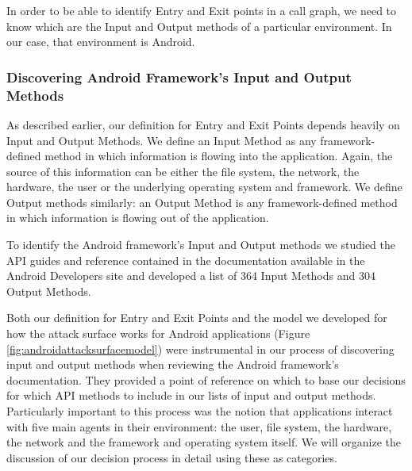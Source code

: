 \documentclass{sig-alternate}
\begin{document}
In order to be able to identify Entry and Exit points in a call graph, we need to know which are the Input and Output methods of a particular environment. In our case, that environment is Android.

\subsubsection{Discovering Android Framework's Input and Output Methods}

As described earlier, our definition for Entry and Exit Points depends heavily on Input and Output Methods. We define an Input Method as any framework-defined method in which information is flowing into the application. Again, the source of this information can be either the file system, the network, the hardware, the user or the underlying operating system and framework. We define Output methods similarly: an Output Method is any framework-defined method in which information is flowing out of the application.

To identify the Android framework’s Input and Output methods we studied the API guides and reference contained in the documentation available in the Android Developers site \cite{android_developers} and developed a list of 364 Input Methods and 304 Output Methods.

Both our definition for Entry and Exit Points and the model we developed for how the attack surface works for Android applications (Figure \ref{fig:androidattacksurfacemodel}) were instrumental in our process of discovering input and output methods when reviewing the Android framework's documentation. They provided a point of reference on which to base our decisions for which API methods to include in our lists of input and output methods. Particularly important to this process was the notion that applications interact with five main agents in their environment: the user, file system, the hardware, the network and the framework and operating system itself. We will organize the discussion of our decision process in detail using these as categories.
\end{document}
